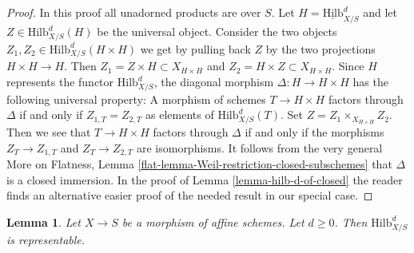 \documentclass{stacks-project}
\theoremstyle{plain}
\newtheorem{lemma}[subsection]{Lemma}
\theoremstyle{definition}
\theoremstyle{remark}
\numberwithin{equation}{subsection}
\def\Hilbfunctor{\mathrm{Hilb}}
\begin{document}
\begin{proof}
In this proof all unadorned products are over $S$.
Let $H = \underline{\Hilbfunctor}^d_{X/S}$ and let
$Z \in \Hilbfunctor^d_{X/S}(H)$ be the universal object.
Consider the two objects $Z_1, Z_2 \in \Hilbfunctor^d_{X/S}(H \times H)$
we get by pulling back $Z$ by the two projections $H \times H \to H$.
Then $Z_1 = Z \times H \subset X_{H \times H}$ and $Z_2 = H \times Z
\subset X_{H \times H}$. Since $H$ represents the functor
$\Hilbfunctor^d_{X/S}$, the diagonal morphism $\Delta : H \to H \times H$
has the following universal property: A morphism of schemes
$T \to H \times H$ factors through $\Delta$ if and only if
$Z_{1, T} = Z_{2, T}$ as elements of $\Hilbfunctor^d_{X/S}(T)$.
Set $Z = Z_1 \times_{X_{H \times H}} Z_2$. Then we see that
$T \to H \times H$ factors through $\Delta$ if and only if
the morphisms $Z_T \to Z_{1, T}$ and $Z_T \to Z_{2, T}$ are
isomorphisms. It follows from the very general
More on Flatness, Lemma \ref{flat-lemma-Weil-restriction-closed-subschemes}
that $\Delta$ is a closed immersion. In the proof of
Lemma \ref{lemma-hilb-d-of-closed}
the reader finds an alternative easier proof of the needed result
in our special case.
\end{proof}

\begin{lemma}
\label{lemma-hilb-d-An}
Let $X \to S$ be a morphism of affine schemes. Let $d \geq 0$. Then
$\Hilbfunctor^d_{X/S}$ is representable.
\end{lemma}
\end{document}
